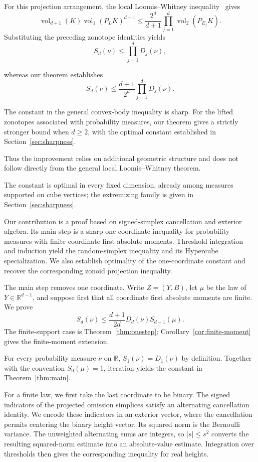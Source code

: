 \documentclass[11pt]{article}
\theoremstyle{remark}
\newcommand{\R}{\mathbb{R}}
\newcommand{\vol}{\operatorname{vol}}
\begin{document}
\begin{humanblock}
For this projection arrangement, the local Loomis--Whitney inequality~\cite[Theorem 4.5]{AG} gives
$$
\vol_{d+1}(K)\vol_1(P_LK)^{d-1}
\leq\frac{2^d}{d+1}
\prod_{j=1}^d\vol_2(P_{E_j}K).
$$
Substituting the preceding zonotope identities yields
$$
S_d(\nu)\leq\prod_{j=1}^dD_j(\nu),
$$

whereas our theorem establishes
$$
S_d(\nu)\leq\frac{d+1}{2^d}\prod_{j=1}^dD_j(\nu).
$$

The constant in the general convex-body inequality is sharp. For the lifted zonotopes associated with probability measures,
our theorem gives a strictly stronger bound when $d\geq2$, with the optimal constant established in Section~\ref{sec:sharpness}.

Thus the improvement relies on additional geometric structure and does not follow directly from the general local Loomis--Whitney theorem.


The constant is optimal in every fixed dimension, already among measures supported on cube vertices; the extremizing family is given in Section~\ref{sec:sharpness}.




Our contribution is a proof based on signed-simplex cancellation and exterior algebra. Its main step is a sharp one-coordinate inequality for probability measures with finite coordinate first absolute moments. Threshold integration and induction yield the random-simplex inequality and its Hypercube specialization. We also establish optimality of the one-coordinate constant and recover the corresponding zonoid projection inequality.




The main step removes one coordinate. Write $Z=(Y,B)$, let $\mu$ be the law of $Y\in\R^{d-1}$, and suppose first that all coordinate first absolute moments are finite. We prove
$$S_d(\nu)\leq\frac{d+1}{2d}D_d(\nu)S_{d-1}(\mu).$$
The finite-support case is Theorem~\ref{thm:onestep}; Corollary~\ref{cor:finite-moment} gives the finite-moment extension.

For every probability measure $\nu$ on $\R$, $S_1(\nu)=D_1(\nu)$ by definition. Together with the convention $S_0(\mu)=1$, iteration yields the constant in Theorem~\ref{thm:main}.


For a finite law, we first take the last coordinate to be binary. The signed indicators of the projected omission simplices satisfy an alternating cancellation identity. We encode these indicators in an exterior vector, where the cancellation permits centering the binary height vector. Its squared norm is the Bernoulli variance. The unweighted alternating sums are integers, so $|s|\leq s^2$ converts the resulting squared-norm estimate into an absolute-value estimate. Integration over
thresholds then gives the corresponding inequality for real heights. 


\end{humanblock}
\end{document}
